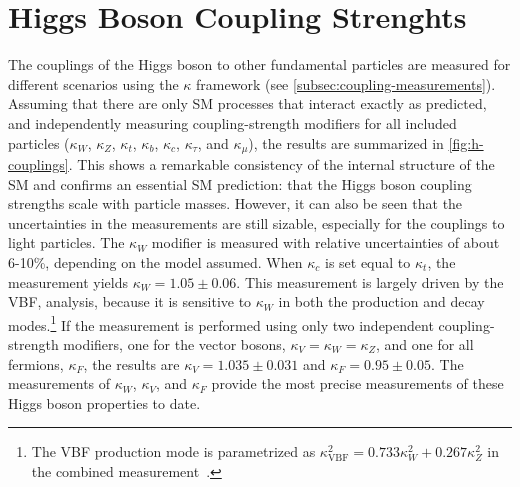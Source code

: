 \section{Higgs Boson Coupling Strenghts}
The couplings of the Higgs boson to other fundamental particles are measured for different scenarios using the $\kappa$ framework (see \cref{subsec:coupling-measurements}).
Assuming that there are only SM processes that interact exactly as predicted, and independently measuring coupling-strength modifiers for all included particles ($\kappa_W$, $\kappa_Z$, $\kappa_t$, $\kappa_b$, $\kappa_c$, $\kappa_\tau$, and $\kappa_\mu$), the results are summarized in \cref{fig:h-couplings}. 
This shows a remarkable consistency of the internal structure of the SM and confirms an essential SM prediction: that the Higgs boson coupling strengths scale with particle masses.
However, it can also be seen that the uncertainties in the measurements are still sizable, especially for the couplings to light particles. 
The $\kappa_W$ modifier is measured with relative uncertainties of about 6-10\%, depending on the model assumed. 
When $\kappa_c$ is set equal to $\kappa_t$, the measurement yields $\kappa_W = 1.05 \pm 0.06$.
This measurement is largely driven by the VBF, \HWW analysis, because it is sensitive to $\kappa_W$ in both the production and decay modes.\footnote{The VBF production mode is parametrized as $\kappa_\mathrm{VBF}^2 = 0.733 \kappa^2_W + 0.267 \kappa^2_Z$ in the combined measurement~\cite{NaturePaper}.}
If the measurement is performed using only two independent coupling-strength modifiers, one for the vector bosons, $\kappa_V = \kappa_W = \kappa_Z$, and one for all fermions, $\kappa_F$, the results are $\kappa_V = 1.035 \pm 0.031$ and $\kappa_F = 0.95 \pm 0.05$. 
The measurements of $\kappa_W$, $\kappa_V$, and $\kappa_F$ provide the most precise measurements of these Higgs boson properties to date.

